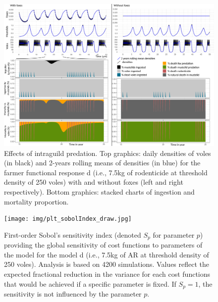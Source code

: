 \documentclass[11pt]{article}
\begin{document}
\begin{figure}
\begin{center}
\includegraphics[width=\linewidth]{img/IGP_Graph.png}
\caption{Effects of intraguild predation. Top graphics: daily densities of voles (in black) and 2-years rolling means of densities (in blue) for the farmer functional response d (i.e., 7.5kg of rodenticide at threshold density of 250 voles) with and without foxes (left and right respectively). Bottom graphics: stacked charts of ingestion and mortality proportion.}
\label{fig:intraguild}
\end{center}
\end{figure}


\begin{figure}
	\begin{center}
		\texttt{[image: img/plt\_sobolIndex\_draw.jpg]}
		\caption{First-order Sobol's sensitivity index (denoted $S_p$ for parameter $p$) providing the global sensitivity of cost functions to parameters of the model \citep{Sobol1993} for the model d (i.e., 7.5kg of AR at threshold density of 250 voles). Analysis is based on 4200 simulations. Values reflect the expected fractional reduction in the variance for each cost functions that would be achieved if a specific parameter is fixed. If $S_p = 1$, the sensitivity is not influenced by the parameter $p$.}
		\label{fig:sobol_sensitivity}
	\end{center}
\end{figure}
\end{document}
